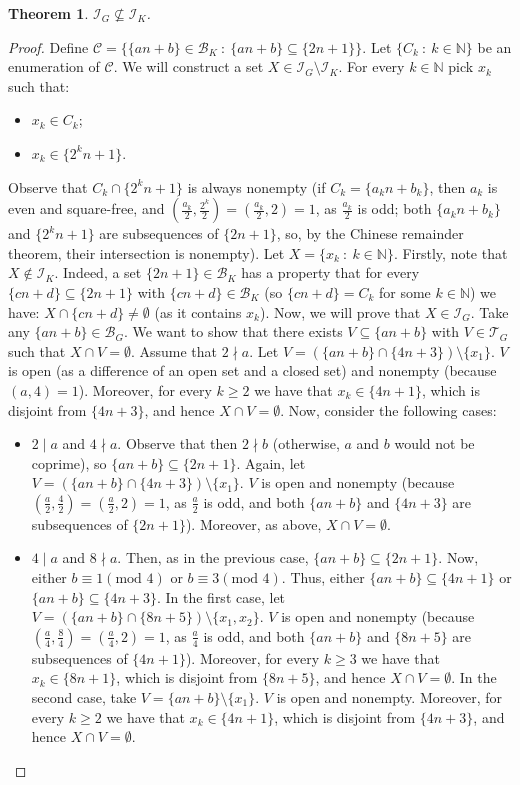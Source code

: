 \documentclass{amsart}
\newtheorem{thm}{Theorem}
\theoremstyle{definition}
\theoremstyle{definition}
\newcommand{\N}{{\mathbb N}}
\newcommand{\I}{\mathcal I}
\newcommand{\T}{\mathcal{T}}
\begin{document}
\begin{thm}
$\I_G \not\subseteq \I_K$.
\end{thm}	   
\begin{proof}
Define $\mathcal{C} = \{\{an+b\}\in \mathcal{B}_K\ :\ \{an+b\}\subseteq \{2n+1\}\}$. Let $\{C_k\ :\ k\in\N\}$ be an enumeration of $\mathcal{C}$.
We will construct a set $X \in \I_G \setminus \I_K$. For every $k\in\N$ pick $x_k$ such that:
\begin{itemize}
	\item $x_k\in C_k$;
	\item $x_k\in \{2^k n+1\}$.
\end{itemize}
Observe that $C_k \cap \{2^k n+1\}$ is always nonempty (if $C_k = \{a_k n+b_k\}$, then $a_k$ is even and square-free, and $(\frac{a_k}{2},\frac{2^k}{2})=(\frac{a_k}{2},2)=1$, as $\frac{a_k}{2}$ is odd; both $\{a_k n+b_k\}$ and $\{2^k n+1\}$ are subsequences of $\{2n+1\}$, so, by the Chinese remainder theorem, their intersection is nonempty). Let $X = \{x_k\ :\ k\in\N\}$.
Firstly, note that $X \notin \I_K$. Indeed, a set $\{2n+1\}\in\mathcal{B}_K$ has a property that for every $\{cn+d\}\subseteq \{2n+1\}$ with $\{cn+d\}\in \mathcal{B}_K$ (so $\{cn+d\}=C_k$ for some $k\in\N$) we have: $X\cap \{cn+d\} \neq \emptyset$ (as it contains $x_k$).
Now, we will prove that $X \in \I_G$. Take any $\{an+b\}\in\mathcal{B}_G$. We want to show that there exists $V\subseteq \{an+b\}$ with $V\in \T_G$ such that $X\cap V = \emptyset$. 
Assume that $2\nmid a$. Let $V = (\{an+b\} \cap \{4n+3\})\setminus\{x_1\}$. $V$ is open (as a difference of an open set and a closed set) and nonempty (because $(a,4)=1$). Moreover, for every $k\geq 2$ we have that $x_k\in \{4n+1\}$, which is disjoint from $\{4n+3\}$, and hence $X\cap V = \emptyset$.
Now, consider the following cases:
\begin{itemize}
 \item $2\mid a$ and $4\nmid a$. Observe that then $2 \nmid b$ (otherwise, $a$ and $b$ would not be coprime), so $\{an+b\}\subseteq \{2n+1\}$. Again, let $V = (\{an+b\} \cap \{4n+3\})\setminus\{x_1\}$. $V$ is open and nonempty (because $(\frac{a}{2},\frac{4}{2})=(\frac{a}{2},2)=1$, as $\frac{a}{2}$ is odd, and both $\{an+b\}$ and $\{4n+3\}$ are subsequences of $\{2n+1\}$). Moreover, as above, $X\cap V = \emptyset$.
 \item $4\mid a$ and $8\nmid a$. Then, as in the previous case, $\{an+b\}\subseteq \{2n+1\}$. Now, either $b\equiv 1 (\textrm{mod } 4)$ or $b\equiv 3 (\textrm{mod } 4)$. Thus, either $\{an+b\}\subseteq \{4n+1\}$ or $\{an+b\}\subseteq \{4n+3\}$. In the first case, let $V = (\{an+b\} \cap \{8n+5\})\setminus\{x_1, x_2\}$. $V$ is open and nonempty (because $(\frac{a}{4},\frac{8}{4})=(\frac{a}{4},2)=1$, as $\frac{a}{4}$ is odd, and both $\{an+b\}$ and $\{8n+5\}$ are subsequences of $\{4n+1\}$). Moreover, for every $k\geq 3$ we have that $x_k\in \{8n+1\}$, which is disjoint from $\{8n+5\}$, and hence $X\cap V = \emptyset$. In the second case, take $V = \{an+b\} \setminus\{x_1\}$. $V$ is open and nonempty. Moreover, for every $k\geq 2$ we have that $x_k\in \{4n+1\}$, which is disjoint from $\{4n+3\}$, and hence $X\cap V = \emptyset$.

\end{itemize}
\end{proof}
\end{document}
